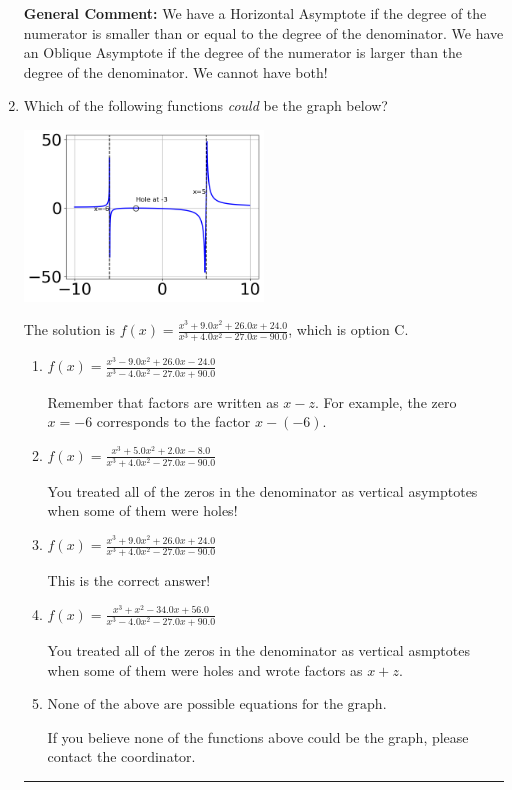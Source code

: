 \documentclass{extbook}[14pt]
\newcommand{\litem}[1]{\item #1

\rule{\textwidth}{0.4pt}}
\begin{document}
\begin{enumerate}
{\textbf{General Comment:} We have a Horizontal Asymptote if the degree of the numerator is smaller than or equal to the degree of the denominator. We have an Oblique Asymptote if the degree of the numerator is larger than the degree of the denominator. We cannot have both!
}
\litem{
Which of the following functions \textit{could} be the graph below?

\begin{center}
    \includegraphics[width=0.5\textwidth]{../Figures/identifyGraphOfRationalFunctionC.png}
\end{center}


The solution is \( f(x)=\frac{x^{3} +9.0 x^{2} +26.0 x + 24.0}{x^{3} +4.0 x^{2} -27.0 x -90.0} \), which is option C.\begin{enumerate}[label=\Alph*.]
\item \( f(x)=\frac{x^{3} -9.0 x^{2} +26.0 x -24.0}{x^{3} -4.0 x^{2} -27.0 x + 90.0} \)

Remember that factors are written as $x-z$. For example, the zero $x=-6$ corresponds to the factor $x-(-6)$.
\item \( f(x)=\frac{x^{3} +5.0 x^{2} +2.0 x -8.0}{x^{3} +4.0 x^{2} -27.0 x -90.0} \)

You treated all of the zeros in the denominator as vertical asymptotes when some of them were holes!
\item \( f(x)=\frac{x^{3} +9.0 x^{2} +26.0 x + 24.0}{x^{3} +4.0 x^{2} -27.0 x -90.0} \)

This is the correct answer!
\item \( f(x)=\frac{x^{3} + x^{2} -34.0 x + 56.0}{x^{3} -4.0 x^{2} -27.0 x + 90.0} \)

You treated all of the zeros in the denominator as vertical asmptotes when some of them were holes and wrote factors as $x+z$.
\item \( \text{None of the above are possible equations for the graph.} \)

If you believe none of the functions above could be the graph, please contact the coordinator.
\end{enumerate}

}
\end{enumerate}
\end{document}
